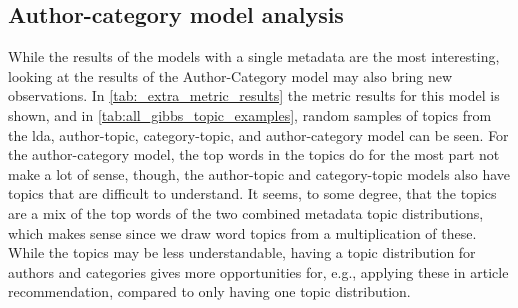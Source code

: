 \subsection{Author-category model analysis}
While the results of the models with a single metadata are the most interesting, looking at the results of the Author-Category model may also bring new observations.
In \autoref{tab:_extra_metric_results} the metric results for this model is shown, and in \autoref{tab:all_gibbs_topic_examples}, random samples of topics from the \gls{lda}, author-topic, category-topic, and author-category model can be seen.
For the author-category model, the top words in the topics do for the most part not make a lot of sense, though, the author-topic and category-topic models also have topics that are difficult to understand.
It seems, to some degree, that the topics are a mix of the top words of the two combined metadata topic distributions, which makes sense since we draw word topics from a multiplication of these.
While the topics may be less understandable, having a topic distribution for authors and categories gives more opportunities for, e.g., applying these in article recommendation, compared to only having one topic distribution.